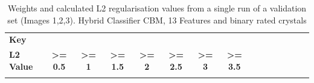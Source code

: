 \begin{landscape}
\begin{table}[]
{\begin{tabular}{@{}lllllllllllllll@{}}
\textbf{Key} &
   &
   &
   &
   &
   &
   &
   &
   &
   &
   &
   &
   &
   &
   \\
\textbf{L2 Value} &
  \multicolumn{1}{c}{\textbf{\textgreater{}= 0.5}} &
  \multicolumn{1}{c}{\textbf{\textgreater{}= 1}} &
  \multicolumn{1}{c}{\textbf{\textgreater{}= 1.5}} &
  \multicolumn{1}{c}{\textbf{\textgreater{}= 2}} &
  \multicolumn{1}{c}{\textbf{\textgreater{}= 2.5}} &
  \multicolumn{1}{c}{\textbf{\textgreater{}= 3}} &
  \multicolumn{1}{c}{\textbf{\textgreater{}= 3.5}} &
   &
   &
   &
   &
   &
   &
   \\
 &
  \cellcolor[HTML]{FFF2CC} &
  \cellcolor[HTML]{FFD966} &
  \cellcolor[HTML]{FFC409} &
  \cellcolor[HTML]{FCE4D6} &
  \cellcolor[HTML]{F8CBAD} &
  \cellcolor[HTML]{F4B084} &
  \cellcolor[HTML]{F0935A} &
   &
   &
   &
   &
   &
   &
  
\end{tabular}%
}
\caption{Weights and calculated L2 regularisation values from a single run of a validation set (Images 1,2,3). Hybrid Classifier CBM, 13 Features and binary rated crystals}
\label{Weights and calculated L2 regularisation values from a single run of a validation set Images 123 Hybrid Classifier CBM 13 Features and binary rated crystals}
\end{table}
\end{landscape}


